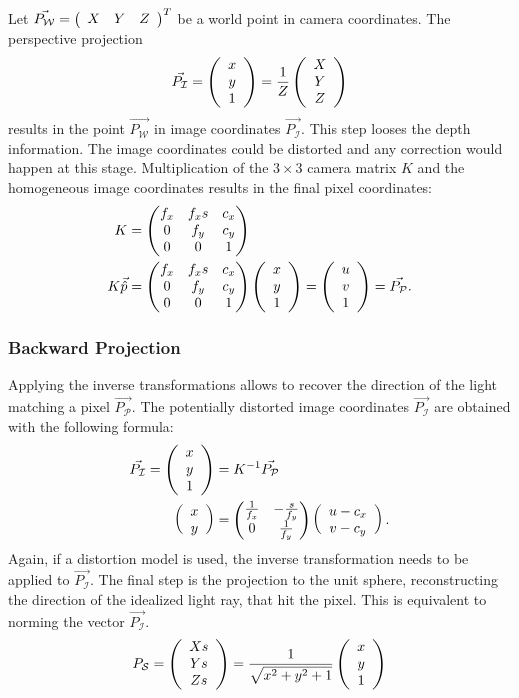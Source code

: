 Let $\vec{P_\mathcal{W}} = \left(\begin{array}{ccc} X & Y & Z \end{array}\right)^T$ be a world point in camera coordinates.
The perspective projection
\begin{equation}
    \vec{P_\mathcal{I}} = \left(\begin{array}{c} x \\ y \\ 1 \end{array}\right) = \frac{1}{Z}\left(\begin{array}{c} X \\ Y \\ Z \end{array}\right)
    \label{eq:pinhole_forward}
\end{equation}
results in the point $\vec{P_\mathcal{W}}$ in image coordinates $\vec{P_\mathcal{I}}$. This step looses the depth information.
The image coordinates could be distorted and any correction would happen at this stage.
Multiplication of the $3 \times 3$ camera matrix $K$ and the homogeneous image coordinates results in the final pixel coordinates:
\begin{equation}
\begin{aligned}
K &= \begin{pmatrix}
        f_x & f_x s & c_x \\
        0   & f_y   & c_y \\
        0   & 0     & 1
     \end{pmatrix} \\
K \vec{\hat{p}} &= \begin{pmatrix}
        f_x & f_x s & c_x \\
        0   & f_y   & c_y \\
        0   & 0     & 1
    \end{pmatrix}\left(\begin{array}{c} x \\ y \\ 1 \end{array}\right) = \left(\begin{array}{c} u \\ v \\ 1 \end{array}\right) = \vec{P_\mathcal{P}}\text{.}
\end{aligned}
\end{equation}

\subsubsection*{Backward Projection}

Applying the inverse transformations allows to recover the direction of the light matching a pixel $\vec{P_\mathcal{P}}$.
The potentially distorted image coordinates $\vec{P_\mathcal{I}}$ are obtained with the following formula:
\begin{equation}
\begin{aligned}
    \vec{P_\mathcal{I}} = \left(\begin{array}{c} x \\ y \\ 1 \end{array}\right) &= K^{-1} \vec{P_\mathcal{P}} \\
    \left(\begin{array}{c} x \\ y \end{array}\right) &= \begin{pmatrix}\frac{1}{f_x} & -\frac{s}{f_y} \\ 0 & \frac{1}{f_y}\end{pmatrix} \left(\begin{array}{c} u - c_x \\ v - c_y \end{array}\right)\text{.}
\end{aligned}
\end{equation}
Again, if a distortion model is used, the inverse transformation needs to be applied to $\vec{P_\mathcal{I}}$.
The final step is the projection to the unit sphere, reconstructing the direction of the idealized light ray, that hit the pixel.
This is equivalent to norming the vector $\vec{P_\mathcal{I}}$.
\begin{equation}
    P_\mathcal{S} = \left(\begin{array}{c} Xs \\ Ys \\ Zs \end{array}\right) = \frac{1}{\sqrt{x^2 + y^2 + 1}} \left(\begin{array}{c} x \\ y \\ 1 \end{array}\right)
    \label{eq:pinhole_backward}
\end{equation}

